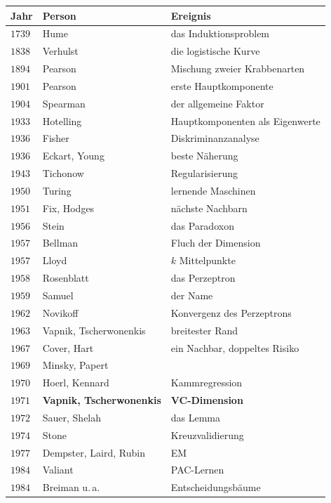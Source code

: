 \begin{merksatz}
\begin{center}
{\small
\renewcommand{\arraystretch}{1.32}
\begin{tabular}{@{}P{1.3cm}P{3.0cm}P{4.0cm}@{}}
\toprule
\textbf{Jahr} & \textbf{Person} & \textbf{Ereignis}\\
\midrule
$1739$ & Hume & das Induktionsproblem\\
$1838$ & Verhulst & die logistische Kurve\\
$1894$ & Pearson & Mischung zweier Krabbenarten\\
$1901$ & Pearson & erste Hauptkomponente\\
$1904$ & Spearman & der allgemeine Faktor\\
$1933$ & Hotelling & Hauptkomponenten als Eigenwerte\\
$1936$ & Fisher & Diskriminanzanalyse\\
$1936$ & Eckart, Young & beste Näherung\\
$1943$ & Tichonow & Regularisierung\\
$1950$ & Turing & lernende Maschinen\\
$1951$ & Fix, Hodges & nächste Nachbarn\\
$1956$ & Stein & das Paradoxon\\
$1957$ & Bellman & Fluch der Dimension\\
$1957$ & Lloyd & $k$ Mittelpunkte\\
$1958$ & Rosenblatt & das Perzeptron\\
$1959$ & Samuel & der Name\\
$1962$ & Novikoff & Konvergenz des Perzeptrons\\
$1963$ & Vapnik, Tscherwonenkis & breitester Rand\\
$1967$ & Cover, Hart & ein Nachbar, doppeltes Risiko\\
$1969$ & Minsky, Papert & \\
$1970$ & Hoerl, Kennard & Kammregression\\
$1971$ & \textbf{Vapnik, Tscherwonenkis} & \textbf{VC-Dimension}\\
$1972$ & Sauer, Shelah & das Lemma\\
$1974$ & Stone & Kreuzvalidierung\\
$1977$ & Dempster, Laird, Rubin & EM\\
$1984$ & Valiant & PAC-Lernen\\
$1984$ & Breiman u.\,a. & Entscheidungsbäume\\

\end{tabular}}
\end{center}
\end{merksatz}
